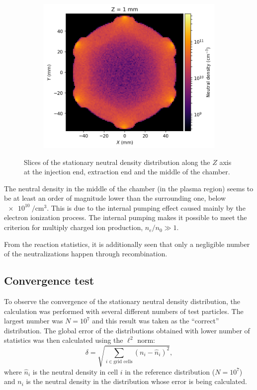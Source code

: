 \documentclass[a4paper,twoside,12pt]{article}
\begin{document}
\begin{figure}[t]
    \begin{subfigure}{0.5\textwidth}
        \centering
        \includegraphics[width=\linewidth]{images/stationary_z_middle.png}
    \end{subfigure}
    \caption{Slices of the stationary neutral density distribution along the $Z$ axis at the injection end, extraction end and the middle of the chamber.}
    \label{fig:stationary_z}
\end{figure}

The neutral density in the middle of the chamber (in the plasma region) seems to be at least an order of magnitude lower than the surrounding one, below $\SI{e10}{\per\centi\metre\cubed}$. This is due to the internal pumping effect caused mainly by the electron ionization process. The internal pumping makes it possible to meet the criterion for multiply charged ion production, $n_e / n_0 \gg 1$.

From the reaction statistics, it is additionally seen that only a negligible number of the neutralizations happen through recombination.

\subsection{Convergence test}
To observe the convergence of the stationary neutral density distribution, the calculation was performed with several different numbers of test particles. The largest number was $N = 10^{7}$ and this result was taken as the ``correct'' distribution. The global error of the distributions obtained with lower number of statistics was then calculated using the $\ell^2$ norm:
\begin{equation}
    \delta = \sqrt{\sum\limits_{i \in \text{grid cells}} (n_i - \hat{n}_i)^2},
\end{equation}
where $\hat{n}_i$ is the neutral density in cell $i$ in the reference distribution ($N = 10^{7}$) and $n_i$ is the neutral density in the distribution whose error is being calculated.
\end{document}
